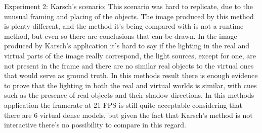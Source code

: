Experiment 2: Karsch's scenario:  This scenario was hard to replicate, due to the unusual framing and placing of the objects. The image produced by this method is plenty different, and the method it's being compared with is not a runtime method, but even so there are conclusions that can be drawn. In the image produced by Karsch's application it's hard to say if the lighting in the real and virtual parts of the image really correspond, the light sources, except for one, are not present in the frame and there are no similar real objects to the virtual ones that would serve as ground truth. In this methods result there is enough evidence to prove that the lighting in both the real and virtual worlds is similar, with cues such as the presence of real objects and their shadow directions.\newline
In this methods application the framerate at 21 FPS is still quite acceptable considering that there are 6 virtual dense models, but given the fact that Karsch's method is not interactive there's no possibility to compare in this regard.
